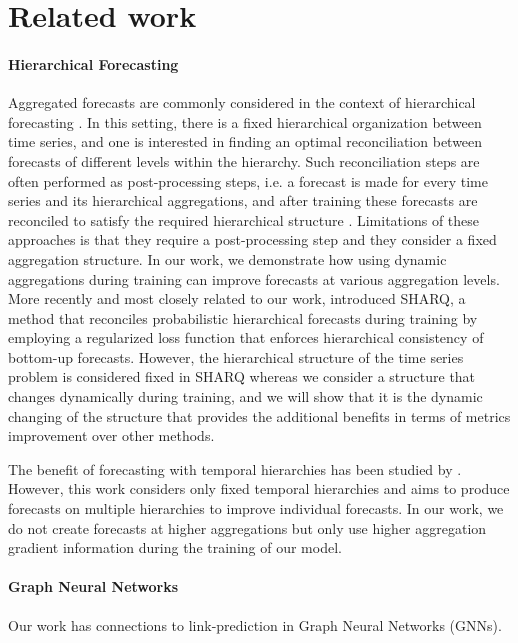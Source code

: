 \documentclass{article}
\begin{document}
\section{Related work}
  \label{sec:relwork}
  \paragraph{Hierarchical Forecasting} Aggregated forecasts are commonly considered in the context of hierarchical forecasting \cite{hyndman_optimal_2011}. In this setting, there is a fixed hierarchical organization between time series, and one is interested in finding an optimal reconciliation between forecasts of different levels within the hierarchy. Such reconciliation steps are often performed as post-processing steps, i.e. a forecast is made for every time series and its hierarchical aggregations, and after training these forecasts are reconciled to satisfy the required hierarchical structure \cite{hyndman_optimal_2011,  hyndman_fast_2016, taieb_coherent_2017, ben_taieb_regularized_2019, wickramasuriya_optimal_2019}. Limitations of these approaches is that they require a post-processing step and they consider a fixed aggregation structure. In our work, we demonstrate how using dynamic aggregations during training can improve forecasts at various aggregation levels. More recently and most closely related to our work, \citet{han_simultaneously_2021} introduced SHARQ, a method that reconciles probabilistic hierarchical forecasts during training by employing a regularized loss function that enforces hierarchical consistency of bottom-up forecasts. However, the hierarchical structure of the time series problem is considered fixed in SHARQ whereas we consider a structure that changes dynamically during training, and we will show that it is the dynamic changing of the structure that provides the additional benefits in terms of metrics improvement over other methods. 

  The benefit of forecasting with temporal hierarchies has been studied by \cite{athanasopoulos_forecasting_2017}. However, this work considers only fixed temporal hierarchies and aims to produce forecasts on multiple hierarchies to improve individual forecasts. In our work, we do not create forecasts at higher aggregations but only use higher aggregation gradient information during the training of our model.

  \paragraph{Graph Neural Networks} Our work has connections to link-prediction in Graph Neural Networks (GNNs). 
\end{document}
